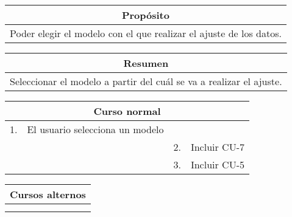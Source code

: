 \begin{table}[!h]
\begin{tabular}{|c|}
\hline
\cellcolor{cyan} \textbf{Propósito} \\
\hline
Poder elegir el modelo con el que realizar el ajuste de los datos.  \\
\hline
\end{tabular}
\end{table}

\begin{table}[!h]
\begin{tabular}{|c|}
\hline
\cellcolor{cyan} \textbf{Resumen}  \\
\hline
Seleccionar el modelo a partir del cuál se va a realizar el ajuste.  \\
\hline
\end{tabular}
\end{table}

\begin{table}[!h]
\begin{tabular}{|c|c|c|c|}
\hline
\multicolumn{4}{|c|}{\cellcolor{cyan} \textbf{Curso normal}} \\
\hline
      1.        &     El usuario selecciona un modelo         &              &              \\
\hline
              &               &      2.        &      Incluir CU-7        \\
\hline
              &               &      3.        &      Incluir CU-5        \\
\hline
\end{tabular}
\end{table}

\begin{table}[!h]
\begin{tabular}{|c|c|}
\hline
\multicolumn{2}{|c|}{\cellcolor{cyan} \textbf{Cursos alternos}} \\
\hline
              &              \\
\hline
              &              \\
\hline
\end{tabular}
\end{table}

